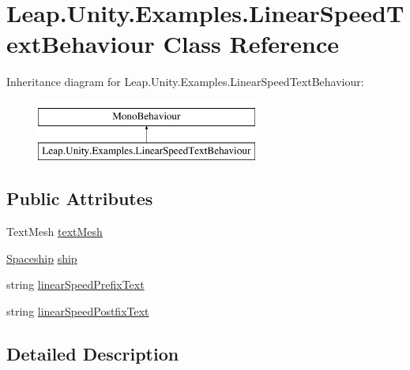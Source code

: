 \hypertarget{class_leap_1_1_unity_1_1_examples_1_1_linear_speed_text_behaviour}{}\section{Leap.\+Unity.\+Examples.\+Linear\+Speed\+Text\+Behaviour Class Reference}
\label{class_leap_1_1_unity_1_1_examples_1_1_linear_speed_text_behaviour}
Inheritance diagram for Leap.\+Unity.\+Examples.\+Linear\+Speed\+Text\+Behaviour\+:\begin{figure}[H]
\begin{center}
\leavevmode
\includegraphics[height=2.000000cm]{class_leap_1_1_unity_1_1_examples_1_1_linear_speed_text_behaviour}
\end{center}
\end{figure}
\subsection*{Public Attributes}
\begin{DoxyCompactItemize}
\item 
Text\+Mesh \mbox{\hyperlink{class_leap_1_1_unity_1_1_examples_1_1_linear_speed_text_behaviour_aa5acda2812bdb43d630e2a7d40477282}{text\+Mesh}}
\item 
\mbox{\hyperlink{class_leap_1_1_unity_1_1_examples_1_1_spaceship}{Spaceship}} \mbox{\hyperlink{class_leap_1_1_unity_1_1_examples_1_1_linear_speed_text_behaviour_af4469464fbdadfcad37541786adde6e2}{ship}}
\item 
string \mbox{\hyperlink{class_leap_1_1_unity_1_1_examples_1_1_linear_speed_text_behaviour_ae27c338e4f1d1754181b10d4422dd5af}{linear\+Speed\+Prefix\+Text}}
\item 
string \mbox{\hyperlink{class_leap_1_1_unity_1_1_examples_1_1_linear_speed_text_behaviour_afd7ffdc397993f033b963bd390350e95}{linear\+Speed\+Postfix\+Text}}
\end{DoxyCompactItemize}


\subsection{Detailed Description}


